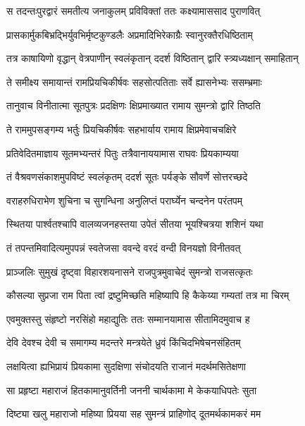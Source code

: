 
\twolineshloka
{स तदन्तःपुरद्वारं समतीत्य जनाकुलम्}
{प्रविविक्तां ततः कक्ष्यामाससाद पुराणवित्} %

\twolineshloka
{प्रासकार्मुकबिभ्रद्भिर्युवभिर्मृष्टकुण्डलैः}
{अप्रमादिभिरेकाग्रैः स्वानुरक्तैरधिष्ठिताम्} %

\twolineshloka
{तत्र काषायिणो वृद्धान् वेत्रपाणीन् स्वलंकृतान्}
{ददर्श विष्ठितान् द्वारि स्त्र्यध्यक्षान् समाहितान्} %

\twolineshloka
{ते समीक्ष्य समायान्तं रामप्रियचिकीर्षवः}
{सहसोत्पतिताः सर्वे ह्यासनेभ्यः ससम्भ्रमाः} %

\twolineshloka
{तानुवाच विनीतात्मा सूतपुत्रः प्रदक्षिणः}
{क्षिप्रमाख्यात रामाय सुमन्त्रो द्वारि तिष्ठति} %

\twolineshloka
{ते राममुपसङ्गम्य भर्तुः प्रियचिकीर्षवः}
{सहभार्याय रामाय क्षिप्रमेवाचचक्षिरे} %

\twolineshloka
{प्रतिवेदितमाज्ञाय सूतमभ्यन्तरं पितुः}
{तत्रैवानाययामास राघवः प्रियकाम्यया} %

\twolineshloka
{तं वैश्रवणसंकाशमुपविष्टं स्वलंकृतम्}
{ददर्श सूतः पर्यङ्के सौवर्णे सोत्तरच्छदे} %

\twolineshloka
{वराहरुधिराभेण शुचिना च सुगन्धिना}
{अनुलिप्तं परार्घ्येन चन्दनेन परंतपम्} %

\twolineshloka
{स्थितया पार्श्वतश्चापि वालव्यजनहस्तया}
{उपेतं सीतया भूयश्चित्रया शशिनं यथा} %

\twolineshloka
{तं तपन्तमिवादित्यमुपपन्नं स्वतेजसा}
{ववन्दे वरदं वन्दी विनयज्ञो विनीतवत्} %

\twolineshloka
{प्राञ्जलिः सुमुखं दृष्ट्वा विहारशयनासने}
{राजपुत्रमुवाचेदं सुमन्त्रो राजसत्कृतः} %

\twolineshloka
{कौसल्या सुप्रजा राम पिता त्वां द्रष्टुमिच्छति}
{महिष्यापि हि कैकेय्या गम्यतां तत्र मा चिरम्} %

\twolineshloka
{एवमुक्तस्तु संहृष्टो नरसिंहो महाद्युतिः}
{ततः सम्मानयामास सीतामिदमुवाच ह} %

\twolineshloka
{देवि देवश्च देवी च समागम्य मदन्तरे}
{मन्त्रयेते ध्रुवं किंचिदभिषेचनसंहितम्} %

\twolineshloka
{लक्षयित्वा ह्यभिप्रायं प्रियकामा सुदक्षिणा}
{संचोदयति राजानं मदर्थमसितेक्षणा} %

\twolineshloka
{सा प्रहृष्टा महाराजं हितकामानुवर्तिनी}
{जननी चार्थकामा मे केकयाधिपतेः सुता} %

\twolineshloka
{दिष्ट्या खलु महाराजो महिष्या प्रियया सह}
{सुमन्त्रं प्राहिणोद् दूतमर्थकामकरं मम} %

